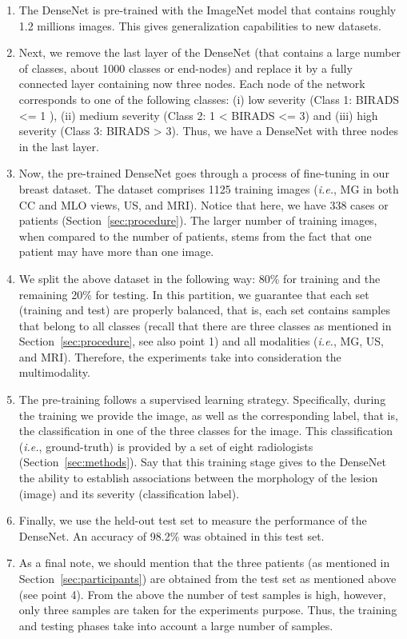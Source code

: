 \begin{enumerate}
\item The DenseNet is pre-trained with the ImageNet model that contains roughly 1.2 millions images. This gives generalization capabilities to new datasets.
\item Next, we remove the last layer of the DenseNet (that contains a large number of classes, about 1000 classes or end-nodes) and replace it by a fully connected layer containing now three nodes. Each node of the network corresponds to one of the following classes: (i) low severity (Class 1: BIRADS <= 1 ), (ii) medium severity  (Class 2:  1 < BIRADS <= 3) and (iii) high severity (Class 3: BIRADS > 3). Thus, we have a DenseNet with three nodes in the last layer.
\hfill
\item Now, the pre-trained DenseNet goes through a process of fine-tuning in our breast dataset. The dataset comprises 1125 training images ({\it i.e.}, MG in both CC and MLO views, US, and MRI). Notice that here, we have 338 cases or patients (Section~\ref{sec:procedure}). The larger number of training images, when compared to the number of patients, stems from the fact that one patient may have more than one image.
\hfill
\item We split the above dataset in the following way: 80\% for training and the remaining 20\% for testing. In this partition, we guarantee that each set (training and test) are properly balanced, that is, each set contains samples that belong to all classes (recall that there are three classes as mentioned in Section~\ref{sec:procedure}, see also point 1) and all modalities ({\it i.e.}, MG, US, and MRI). Therefore, the experiments take into consideration the multimodality.
\hfill
\item The pre-training follows a supervised learning strategy. Specifically, during the training we provide the image, as well as the corresponding label, that is, the classification in one of the three classes for the image. This classification ({\it i.e.}, ground-truth) is provided by a set of eight radiologists (Section~\ref{sec:methods}). Say that this training stage gives to the DenseNet the ability to establish associations between the morphology of the lesion (image) and its severity (classification label).
\hfill
\item Finally, we use the held-out test set to measure the performance of the DenseNet. An accuracy of 98.2\% was obtained in this test set.
\hfill
\item As a final note, we should mention that the three patients (as mentioned in Section~\ref{sec:participants}) are obtained from the test set as mentioned above (see point 4). 
From the above the number of test samples is high, however, only three samples are taken  for the experiments purpose. Thus, the training and testing phases take into account a large number of samples.
\end{enumerate}

%


